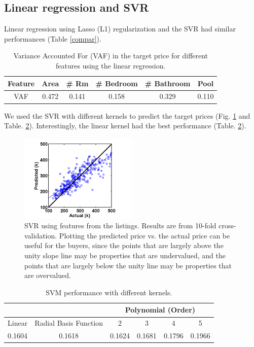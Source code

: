 \documentclass[conference]{IEEEtran}
\begin{document}
\subsection{Linear regression and SVR}

Linear regression using Lasso (L1) regularization and the SVR had similar performances (Table \ref{compar}). 

\begin{table}[htbp]
\footnotesize
\centering
\caption{\footnotesize Variance Accounted For (VAF) in the target price for different features using the linear regression.}
\begin{tabular}{|c|c|c|c|c|c|}
\hline
Feature & Area & \# Rm & \# Bedroom & \# Bathroom & Pool\\ \hline
VAF & 0.472 & 0.141 & 0.158 & 0.329 & 0.110\\
\hline
\end{tabular}
\label{vaf}
\end{table}
\normalsize

We used the SVR with different kernels to predict the target prices (Fig. \ref{pred1} and Table. \ref{svm}). Interestingly, the linear kernel had the best performance (Table. \ref{svm}).

\begin{figure}[H]
\centering
\includegraphics[width=0.5\textwidth]{predict1.png}
\caption{\scriptsize SVR using features from the listings. Results are from 10-fold cross-validation. Plotting the predicted price vs. the actual price can be useful for the buyers, since the points that are largely above the unity slope line may be properties that are undervalued, and the points that are largely below the unity line may be properties that are overvalued.}
\label{pred1}
\end{figure}

\begin{table}[htbp]
\footnotesize
\centering
\caption{\footnotesize SVM performance with different kernels.}
\begin{tabular}{|c|c|c|c|c|c|}
\cline{3-6}
\multicolumn{2}{c|}{} & \multicolumn{4}{c|}{Polynomial (Order)} \\
\hline
Linear & Radial Basis Function & 2 & 3 & 4 & 5 \\
\hline
0.1604 & 0.1618 & 0.1624 & 0.1681 & 0.1796 & 0.1966 \\
\hline
\end{tabular}
\label{svm}
\end{table}
\normalsize
\end{document}
